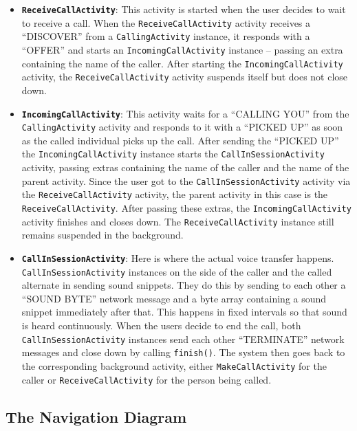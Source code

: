 \documentclass[12pt,svgnames,smaller]{article} %
\begin{document}
\begin{itemize}
			\item \textbf{\texttt{ReceiveCallActivity}}: This activity is started when the user decides to wait to receive a call. When the \texttt{ReceiveCallActivity} activity receives a “DISCOVER” from a \texttt{CallingActivity} instance, it responds with a “OFFER” and starts an \texttt{IncomingCallActivity} instance – passing an extra containing the name of the caller. After starting the \texttt{IncomingCallActivity} activity, the \texttt{ReceiveCallActivity} activity suspends itself but does not close down.
			\item \textbf{\texttt{IncomingCallActivity}}: This activity waits for a “CALLING YOU” from the \texttt{CallingActivity} activity and responds to it with a “PICKED UP” as soon as the called individual picks up the call. After sending the “PICKED UP” the \texttt{IncomingCallActivity} instance starts the \texttt{CallInSessionActivity} activity, passing extras containing the name of the caller and the name of the parent activity. Since the user got to the \texttt{CallInSessionActivity} activity via the \texttt{ReceiveCallActivity} activity, the parent activity in this case is the \texttt{ReceiveCallActivity}. After passing these extras, the \texttt{IncomingCallActivity} activity finishes and closes down. The \texttt{ReceiveCallActivity} instance still remains suspended in the background.
			\item \textbf{\texttt{CallInSessionActivity}}: Here is where the actual voice transfer happens. \texttt{CallInSessionActivity} instances on the side of the caller and the called alternate in sending sound snippets. They do this by sending to each other a “SOUND BYTE” network message and a byte array containing a sound snippet immediately after that. This happens in fixed intervals so that sound is heard continuously. When the users decide to end the call, both \texttt{CallInSessionActivity} instances send each other “TERMINATE” network messages and close down by calling \texttt{finish()}. The system then goes back to the corresponding background activity, either \texttt{MakeCallActivity} for the caller or \texttt{ReceiveCallActivity} for the person being called.
		\end{itemize}
	
	\subsection{The Navigation Diagram}
\end{document}
